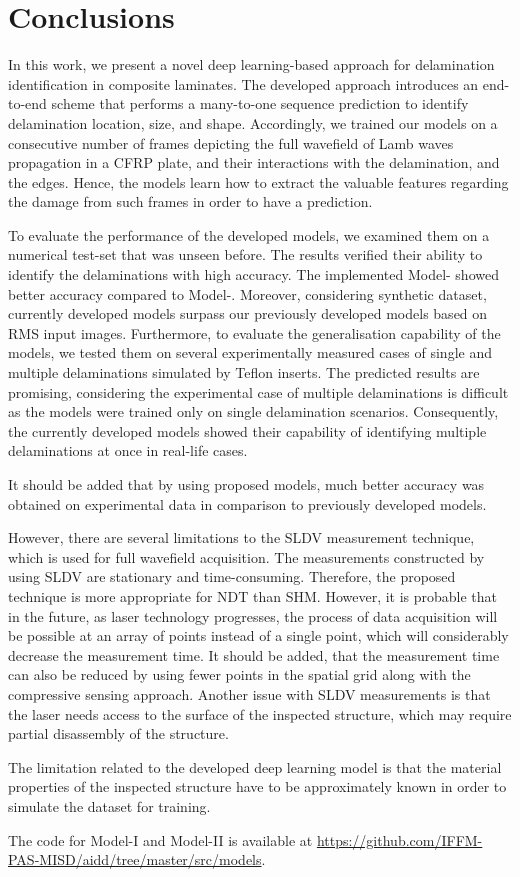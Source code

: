 \section{Conclusions}
\label{conclusion}
In this work, we present a novel deep learning-based approach for delamination identification in composite laminates.
The developed approach introduces an end-to-end scheme that performs a many-to-one sequence prediction to identify delamination location, size, and shape.
Accordingly, we trained our models on a consecutive number of frames depicting the full wavefield of Lamb waves propagation in a CFRP plate, and their interactions with the delamination, and the edges.
Hence, the models learn how to extract the valuable features regarding the damage from such frames in order to have a prediction.

To evaluate the performance of the developed models, we examined them on a numerical test-set that was unseen before.
The results verified their ability to identify the delaminations with high accuracy. 
The implemented Model- showed better accuracy compared to Model-.
Moreover, considering synthetic dataset, currently developed models surpass our previously developed models based on RMS input images.
Furthermore, to evaluate the generalisation capability of the models, we tested them on several experimentally measured cases of single and multiple delaminations simulated by Teflon inserts.
The predicted results are promising, considering the experimental case of multiple delaminations is difficult as the models were trained only on single delamination scenarios.
Consequently, the currently developed models showed their capability of identifying multiple delaminations at once in real-life cases.

It should be added that by using proposed models, much better accuracy was obtained on experimental data in comparison to previously developed models.

However, there are several limitations to the SLDV measurement technique, which is used for full wavefield acquisition.
The measurements constructed by using SLDV are stationary and time-consuming.
Therefore, the proposed technique is more appropriate for NDT than SHM.
However, it is probable that in the future, as laser technology progresses, the process of data acquisition will be possible at an array of points instead of a single point, which will considerably decrease the measurement time.
It should be added, that the measurement time can also be reduced by using fewer points in the spatial grid along with the compressive sensing approach.
Another issue with SLDV measurements is that the laser needs access to the surface of the inspected structure, which may require partial disassembly of the structure.

The limitation related to the developed deep learning model is that the material properties of the inspected structure have to be approximately known in order to simulate the dataset for training.

The code for Model-I and Model-II is available at \url{https://github.com/IFFM-PAS-MISD/aidd/tree/master/src/models}.